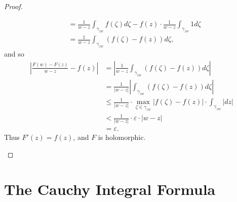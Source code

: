 \documentclass[12pt,openany]{book}
\theoremstyle{definition}
\newcommand{\of}[1]{\left( #1 \right)}
\newcommand{\abs}[1]{\left\lvert #1 \right\rvert}
\begin{document}
\begin{proof}
\begin{enumerate}[(i)]
\begin{align*}
				&=\frac{1}{w-z}\int_{\gamma_{zw}}f\of{\zeta}d\zeta-f\of{z}\cdot\frac{1}{w-z}\int_{\gamma_{zw}}1d\zeta\\
				&=\frac{1}{w-z}\int_{\gamma_{zw}}\of{f\of{\zeta}-f\of{z}}d\zeta,
			\end{align*} and so \begin{align*}
				\abs{\frac{F\of{w}-F\of{z}}{w-z}-f\of{z}}&=\abs{\frac{1}{w-z}\int_{\gamma_{zw}}\of{f\of{\zeta}-f\of{z}}d\zeta}\\
				&=\frac{1}{\abs{w-z}}\abs{\int_{\gamma_{zw}}\of{f\of{\zeta}-f\of{z}}d\zeta}\\
				&\leq\frac{1}{\abs{w-z}}\cdot\max_{\zeta\in\gamma_{zw}}\abs{f\of{\zeta}-f\of{z}}\cdot\int_{\gamma_{zw}}\abs{dz}\\
				&<\frac{1}{\abs{w-z}}\cdot\varepsilon\cdot\abs{w-z}\\
				&=\varepsilon.
			\end{align*} Thus $F'\of{z}=f\of{z}$, and $F$ is holomorphic.
		\end{enumerate}
	\end{proof}
	
	\newpage
	\section{The Cauchy Integral Formula}
	
\end{document}
